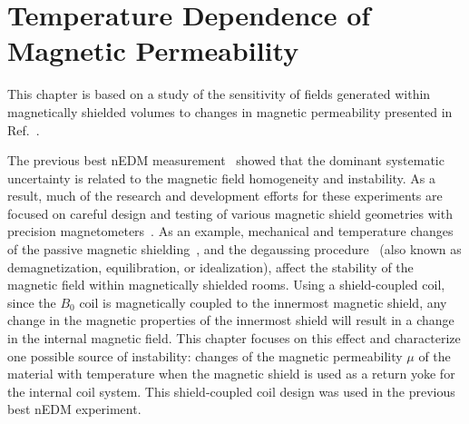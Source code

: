 \chapter{Temperature Dependence of Magnetic Permeability\label{chap:muofT}}
This chapter is based on a study of the sensitivity of fields
generated within magnetically shielded volumes to changes in magnetic
permeability presented in Ref.~\cite{Andalib:2016ahj}.

The previous best nEDM measurement~\cite{Baker2006, Pendlebury2015} showed that
the dominant systematic uncertainty is related to the magnetic field
homogeneity and instability. As a result, much of the research and
development efforts for these experiments are focused on careful
design and testing of various magnetic shield geometries with
precision magnetometers~\cite{altarev2014magnetically,
  brys2005magnetic,afach2014dynamic,patton2014all}. As an example,
mechanical and temperature changes of the passive magnetic
shielding~\cite{voigt2013,thiel2007demagnetization}, and the
degaussing
procedure~\cite{thiel2007demagnetization,altarev2015minimizing,sun2016dynamic}
(also known as demagnetization, equilibration, or idealization),
affect the stability of the magnetic field within magnetically
shielded rooms. Using a shield-coupled coil, since the $B_0$ coil is
magnetically coupled to the innermost magnetic shield, any change in
the magnetic properties of the innermost shield will result in a change in
the internal magnetic field. This chapter focuses on this
effect and characterize one possible source of instability: changes of
the magnetic permeability $\mu$ of the material with temperature when
the magnetic shield is used as a return yoke for the internal coil
system. This shield-coupled coil design was used in the previous best
nEDM experiment.




